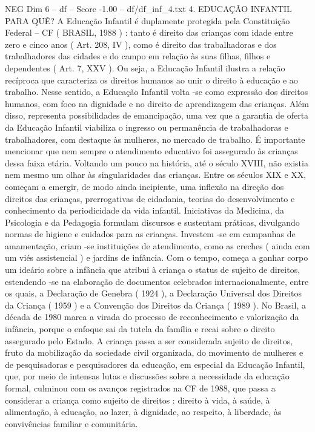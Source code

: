 \begin{textsample}{NEG Dim 6 – df – Score -1.00 – df/df\_inf\_4.txt}  \label{ex:f6_neg_161}
4.
EDUCAÇÃO INFANTIL PARA QUÊ?
A Educação Infantil é duplamente protegida pela Constituição Federal – CF ( BRASIL, 1988 ) : tanto é direito das crianças com idade entre zero e cinco anos ( Art. 208, IV ), como é direito das trabalhadoras e dos trabalhadores das cidades e do campo em relação às suas filhas, filhos e dependentes ( Art. 7, XXV ).
Ou seja, a Educação Infantil ilustra a relação recíproca que caracteriza os direitos humanos ao unir o direito à educação e ao trabalho.
Nesse sentido, a Educação Infantil volta -se como expressão dos direitos humanos, com foco na dignidade e no direito de aprendizagem das crianças.
Além disso, representa possibilidades de emancipação, uma vez que a garantia de oferta da Educação Infantil viabiliza o ingresso ou permanência de trabalhadoras e trabalhadores, com destaque às mulheres, no mercado de trabalho.
É importante mencionar que nem sempre o atendimento educativo foi assegurado às crianças dessa faixa etária.
Voltando um pouco na história, até o século XVIII, não existia nem mesmo um olhar às singularidades das crianças.
Entre os séculos XIX e XX, começam a emergir, de modo ainda incipiente, uma inflexão na direção dos direitos das crianças, prerrogativas de cidadania, teorias do desenvolvimento e conhecimento da periodicidade da vida infantil.
Iniciativas da Medicina, da Psicologia e da Pedagogia formulam discursos e sustentam práticas, divulgando normas de higiene e cuidados para as crianças.
Investem -se em campanhas de amamentação, criam -se instituições de atendimento, como as creches ( ainda com um viés assistencial ) e jardins de infância.
Com o tempo, começa a ganhar corpo um ideário sobre a infância que atribui à criança o status de sujeito de direitos, estendendo -se na elaboração de documentos celebrados internacionalmente, entre os quais, a Declaração de Genebra ( 1924 ), a Declaração Universal dos Direitos da Criança ( 1959 ) e a Convenção dos Direitos da Criança ( 1989 ).
No Brasil, a década de 1980 marca a virada do processo de reconhecimento e valorização da infância, porque o enfoque sai da tutela da família e recai sobre o direito assegurado pelo Estado.
A criança passa a ser considerada sujeito de direitos, fruto da mobilização da sociedade civil organizada, do movimento de mulheres e de pesquisadoras e pesquisadores da educação, em especial da Educação Infantil, que, por meio de intensas lutas e discussões sobre a necessidade da educação formal, culminou com os avanços registrados na CF de 1988, que passa a considerar a criança como sujeito de direitos : direito à vida, à saúde, à alimentação, à educação, ao lazer, à dignidade, ao respeito, à liberdade, às convivências familiar e comunitária.

\end{textsample}
